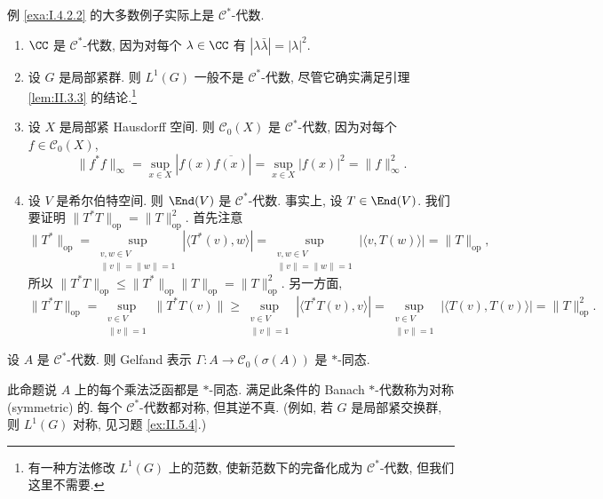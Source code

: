 \begin{example}
\label{exa:II.3.4}
例 \ref{exa:I.4.2.2} 的大多数例子实际上是 $\mathcal{C}^*$-代数.
\begin{enumerate}
\item[(a)] $\CC$ 是 $\mathcal{C}^*$-代数, 因为对每个 $\lambda \in \CC$ 有 $|\lambda\bar{\lambda}| = |\lambda|^2$.
\item[(b)] 设 $G$ 是局部紧群. 则 $L^1(G)$ 一般不是 $\mathcal{C}^*$-代数, 尽管它确实满足引理 \ref{lem:II.3.3} 的结论.\footnote{有一种方法修改 $L^1(G)$ 上的范数, 使新范数下的完备化成为 $\mathcal{C}^*$-代数, 但我们这里不需要.}
\item[(c)] 设 $X$ 是局部紧 Hausdorff 空间. 则 $\mathcal{C}_0(X)$ 是 $\mathcal{C}^*$-代数, 因为对每个 $f \in \mathcal{C}_0(X)$,
\[
\|f^*f\|_{\infty} = \sup_{x \in X}|f(x)\overline{f(x)}| = \sup_{x \in X}|f(x)|^2 = \|f\|_{\infty}^2.
\]
\item[(d)] 设 $V$ 是希尔伯特空间. 则 $\End(V)$ 是 $\mathcal{C}^*$-代数. 事实上, 设 $T \in \End(V)$. 我们要证明 $\|T^*T\|_{\mathrm{op}} = \|T\|_{\mathrm{op}}^2$. 首先注意
\[
\|T^*\|_{\mathrm{op}} = \sup_{\substack{v,w \in V\\ \|v\| = \|w\| = 1}}|\langle T^*(v), w \rangle| = \sup_{\substack{v,w \in V\\ \|v\| = \|w\| = 1}}|\langle v, T(w) \rangle| = \|T\|_{\mathrm{op}},
\]
所以 $\|T^*T\|_{\mathrm{op}} \leq \|T^*\|_{\mathrm{op}}\|T\|_{\mathrm{op}} = \|T\|_{\mathrm{op}}^2$. 另一方面,
\[
\|T^*T\|_{\mathrm{op}} = \sup_{\substack{v \in V\\ \|v\| = 1}}\|T^*T(v)\| \geq \sup_{\substack{v \in V\\ \|v\| = 1}}|\langle T^*T(v), v \rangle| = \sup_{\substack{v \in V\\ \|v\| = 1}}|\langle T(v), T(v) \rangle| = \|T\|_{\mathrm{op}}^2.
\]
\end{enumerate}
\end{example}

\begin{proposition}[乘法泛函是 $*$-同态]
\label{prop:II.3.5}
设 $A$ 是 $\mathcal{C}^*$-代数. 则 Gelfand 表示 $\Gamma \colon A \to \mathcal{C}_0(\sigma(A))$ 是 $*$-同态.
\end{proposition}

\begin{remark}[对称性]
\label{rem:II.3.6}
此命题说 $A$ 上的每个乘法泛函都是 $*$-同态. 满足此条件的 Banach $*$-代数称为对称 (symmetric) 的. 每个 $\mathcal{C}^*$-代数都对称, 但其逆不真. (例如, 若 $G$ 是局部紧交换群, 则 $L^1(G)$ 对称, 见习题 \ref{ex:II.5.4}.)
\end{remark}

